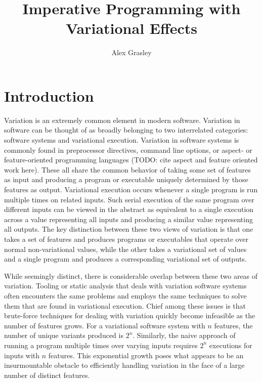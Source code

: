 \documentclass[letterpaper,10pt,onecolumn]{article}
\title{Imperative Programming with Variational Effects}
\author{Alex Grasley}
\begin{document}
\maketitle

\section{Introduction}

Variation is an extremely common element in modern software. Variation in software can be
thought of as broadly belonging to two interrelated categories: software systems and variational execution.
Variation in software systems is commonly found in preprocessor directives, command line options, or aspect- or feature-oriented
programming languages (TODO: cite aspect and feature oriented work here).
These all share the common behavior of taking some set of features as input and
producing a program or executable uniquely determined by those features as output. Variational execution occurs whenever a single
program is run multiple times on related inputs. Such serial execution of the same program over different inputs can be viewed in the abstract
as equivalent to a single execution across a value representing all inputs and producing a similar value representing all outputs.
The key distinction between these two views of variation is that one takes a set of features and produces programs or executables that
operate over normal non-variational values, while the other takes a variational set of values and a single program and produces a corresponding variational set of outputs.

While seemingly distinct, there is considerable overlap between these two areas of variation. Tooling or static analysis that deals with
variation software systems often encounters the same problems and employs the same techniques to solve them
that are found in variational execution. Chief among these issues is that brute-force techniques for dealing with variation quickly become infeasible as the
number of features grows. For a variational software system with $n$ features, the number of unique variants produced is $2^n$. Similarly, the naive approach
of running a program multiple times over varying inputs requires $2^n$ executions for inputs with $n$ features. This exponential growth poses what appears to
be an insurmountable obstacle to efficiently handling variation in the face of a large number of distinct features.
\end{document}
